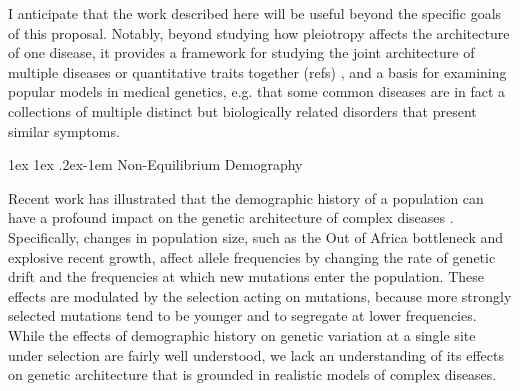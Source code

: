 \documentclass[11pt]{article}
\makeatletter
\newcommand{\jb}[1]{{\color{blue} (#1)} }
\renewcommand{\paragraph}{%
  \@startsection{paragraph}{4}%
  {\z@}{1ex \@plus 1ex \@minus .2ex}{-1em}%
  {\normalfont\normalsize\bfseries}%
}
\makeatother
\begin{document}

I anticipate that the work described here will be useful beyond the specific goals of this proposal. Notably, beyond studying how pleiotropy affects the architecture of one disease, it provides a framework for studying the joint architecture of multiple diseases or quantitative traits together \jb{refs}, and a basis for examining popular models in medical genetics, e.g. that some common diseases are in fact a collections of multiple distinct but biologically related disorders that present similar symptoms\cite{Gottesman:2003ul, Flint:2007ia, Kendler:2010kw, Mitchell:2012hw}. 



\paragraph{Non-Equilibrium Demography}

Recent work has illustrated that the demographic history of a population can have a profound impact on the genetic architecture of complex diseases \cite{Tennessen:2012ek,Keinan:2012kl,Simons:2014fj, Gao:2014dz, Gazave:2013jh, Lohmueller:2014gd}. Specifically, changes in population size, such as the Out of Africa bottleneck and explosive recent growth, affect allele frequencies\cite{Tennessen:2012ek,Keinan:2012kl} by changing the rate of genetic drift and the frequencies at which new mutations enter the population. These effects are modulated by the selection acting on mutations, because more strongly selected mutations tend to be younger and to segregate at lower frequencies\cite{Simons:2014fj}. While the effects of demographic history on genetic variation at a single site under selection are fairly well understood, we lack an understanding of its effects on genetic architecture that is grounded in realistic models of complex diseases.   
\end{document}
